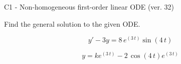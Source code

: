\begin{exercise}
  \begin{exerciseTitle}C1 - Non-homogeneous first-order linear ODE (ver. 32)\end{exerciseTitle}
  \begin{exerciseStatement}
    
Find the general solution to the given ODE.

    
\[y'-3y= 8 \, e^{\left(3 \, t\right)} \sin\left(4 \, t\right)\]

  \end{exerciseStatement}
  \begin{exerciseAnswer}
    
\[y= k e^{\left(3 \, t\right)} - 2 \, \cos\left(4 \, t\right) e^{\left(3 \, t\right)}\]

  \end{exerciseAnswer}
\end{exercise}
